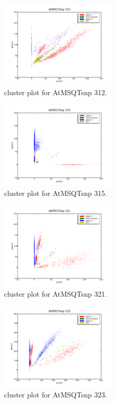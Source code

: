 \begin{figure}[H]
\includegraphics[width=0.5\textwidth]{figures/cluster_plot_AtMSQTsnp_312.png}
\caption{cluster plot for AtMSQTsnp 312.} \label{flAtMSQTsnp312}
\end{figure}

\begin{figure}[H]
\includegraphics[width=0.5\textwidth]{figures/cluster_plot_AtMSQTsnp_315.png}
\caption{cluster plot for AtMSQTsnp 315.} \label{flAtMSQTsnp315}
\end{figure}

\begin{figure}[H]
\includegraphics[width=0.5\textwidth]{figures/cluster_plot_AtMSQTsnp_321.png}
\caption{cluster plot for AtMSQTsnp 321.} \label{flAtMSQTsnp321}
\end{figure}

\begin{figure}[H]
\includegraphics[width=0.5\textwidth]{figures/cluster_plot_AtMSQTsnp_323.png}
\caption{cluster plot for AtMSQTsnp 323.} \label{flAtMSQTsnp323}
\end{figure}

